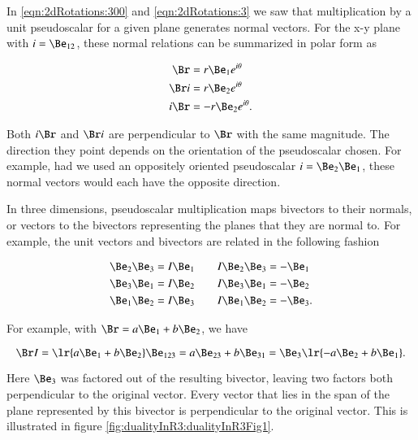 %
%
In \cref{eqn:2dRotations:300} and \cref{eqn:2dRotations:3} we saw that multiplication by a unit pseudoscalar for a given plane generates normal vectors.  For the x-y plane with \( i = \Be_{12} \), these normal relations can be summarized in polar form as

\begin{equation}\label{eqn:dual:1620}
\begin{aligned}
\Br &= r \Be_1 e^{i\theta} \\
\Br i &= r \Be_2 e^{i\theta} \\
i \Br &= -r \Be_2 e^{i\theta}.
\end{aligned}
\end{equation}

Both \( i \Br \) and \( \Br i \) are perpendicular to \( \Br \) with the same magnitude.
The direction they point depends on the orientation of the pseudoscalar chosen.  For example,
had we used an oppositely oriented pseudoscalar \( i = \Be_2 \Be_1 \), these normal vectors would each have the opposite direction.

In three dimensions, pseudoscalar multiplication maps bivectors to their normals, or vectors to the bivectors representing the planes that they are normal to.  For example, the unit vectors and bivectors are related in the following fashion

\begin{equation}\label{eqn:products:1580}
\begin{aligned}
\Be_2 \Be_3 &= I \Be_1 \qquad I \Be_2 \Be_3 = -\Be_1 \\
\Be_3 \Be_1 &= I \Be_2 \qquad I \Be_3 \Be_1 = -\Be_2 \\
\Be_1 \Be_2 &= I \Be_3 \qquad I \Be_1 \Be_2 = -\Be_3.
\end{aligned}
\end{equation}

For example, with \( \Br = a \Be_1 + b \Be_2 \), we have

\begin{dmath}\label{eqn:dual:1640}
\Br I
=
\lr{ a \Be_1 + b \Be_2 } \Be_{123}
=
a \Be_{23} + b \Be_{31}
=
\Be_3 \lr{ -a \Be_{2} + b \Be_{1} }.
\end{dmath}

Here \( \Be_3 \) was factored out of the resulting bivector, leaving two factors both perpendicular to the original vector.  Every vector that lies in the span of the plane represented by this bivector is perpendicular to the original vector.
This is illustrated in figure \cref{fig:dualityInR3:dualityInR3Fig1}.

